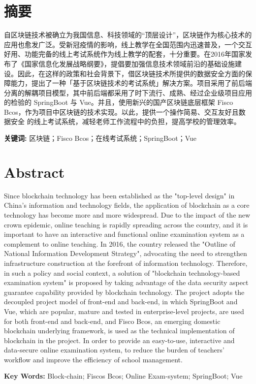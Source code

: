 \section*{\centering 摘要}
\vskip0.5cm
自区块链技术被确立为我国信息、科技领域的“顶层设计”，区块链作为核心技术的应用也愈发广泛。受新冠疫情的影响，线上教学在全国范围内迅速普及，一个交互好用、功能完备的线上考试系统作为线上教学的配套，十分重要。在2016年国家发布了《国家信息化发展战略纲要》，提倡要加强信息技术领域前沿的基础设施建设。因此，在这样的政策和社会背景下，借区块链技术所提供的数据安全方面的保障能力，提出了一种「基于区块链技术的考试系统」解决方案。项目采用了前后端分离的解耦项目模型，其中前后端都采用了时下流行、成熟、经过企业级项目应用的检验的 SpringBoot 与 Vue。并且，使用新兴的国产区块链底层框架 Fisco Bcos，作为项目中区块链的技术实现。以此，提供一个操作简易、交互友好且数据安全  的线上考试系统，减轻老师工作流程中的负担，提高学校的管理效率。

\textbf{关键词:} 区块链；Fisco Bcos；在线考试系统；SpringBoot；Vue

\clearpage  %

\section*{\centering \textbf{Abstract}}
\vskip0.5cm
Since blockchain technology has been established as the "top-level design" in China's information and technology fields, the application of blockchain as a core technology has become more and more widespread. Due to the impact of the new crown epidemic, online teaching is rapidly spreading across the country, and it is important to have an interactive and functional online examination system as a complement to online teaching. In 2016, the country released the "Outline of National Information Development Strategy", advocating the need to strengthen infrastructure construction at the forefront of information technology. Therefore, in such a policy and social context, a solution of "blockchain technology-based examination system" is proposed by taking advantage of the data security aspect guarantee capability provided by blockchain technology. The project adopts the decoupled project model of front-end and back-end, in which SpringBoot and Vue, which are popular, mature and tested in enterprise-level projects, are used for both front-end and back-end, and Fisco Bcos, an emerging domestic blockchain underlying framework, is used as the technical implementation of blockchain in the project. In order to provide an easy-to-use, interactive and data-secure online examination system, to reduce the burden of teachers' workflow and improve the efficiency of school management.

\textbf{Key Words:} Block-chain; Fiscos Bcos; Online Exam-system; SpringBoot; Vue

